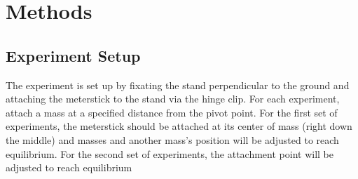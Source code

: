 \documentclass[12pt]{article}
\begin{document}
    \section{Methods}
        \subsection{Experiment Setup}
            The experiment is set up by fixating the stand perpendicular to the
            ground and attaching the meterstick to the stand via the hinge clip.
            For each experiment, attach a mass at a specified distance from the
            pivot point. For the first set of experiments, the meterstick should
            be attached at its center of mass (right down the middle) and masses
            and another mass's position will be adjusted to reach equilibrium.
            For the second set of experiments, the attachment point will be 
            adjusted to reach equilibrium
\end{document}
